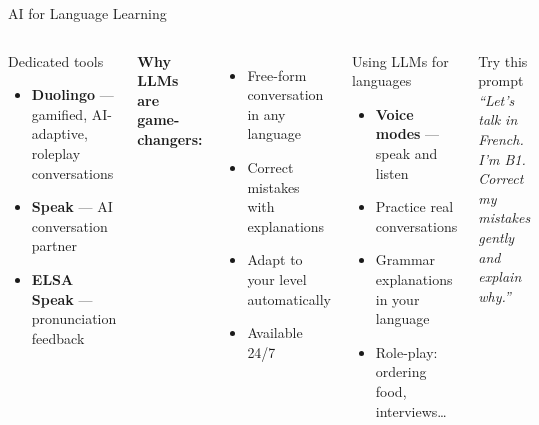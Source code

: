 \documentclass[aspectratio=169]{beamer}
\begin{document}
\begin{frame}{AI for Language Learning}
\small
\begin{columns}[T]
\begin{block}{Dedicated tools}
\begin{itemize}\setlength\itemsep{0em}
  \item \textbf{Duolingo} --- gamified, AI-adaptive, roleplay conversations
  \item \textbf{Speak} --- AI conversation partner
  \item \textbf{ELSA Speak} --- pronunciation feedback
\end{itemize}
\end{block}

\smallskip
\textbf{\color{popblue}Why LLMs are game-changers:}
\begin{itemize}\setlength\itemsep{0em}
  \item Free-form conversation in any language
  \item Correct mistakes with explanations
  \item Adapt to your level automatically
  \item Available 24/7
\end{itemize}

\begin{block}{Using LLMs for languages}
\begin{itemize}\setlength\itemsep{0em}
  \item \textbf{Voice modes} --- speak and listen
  \item Practice real conversations
  \item Grammar explanations in your language
  \item Role-play: ordering food, interviews\ldots
\end{itemize}
\end{block}

\smallskip
\begin{exampleblock}{Try this prompt}
\textit{``Let's talk in French. I'm B1. Correct my mistakes gently and explain why.''}
\end{exampleblock}
\end{columns}
\end{frame}
\end{document}
